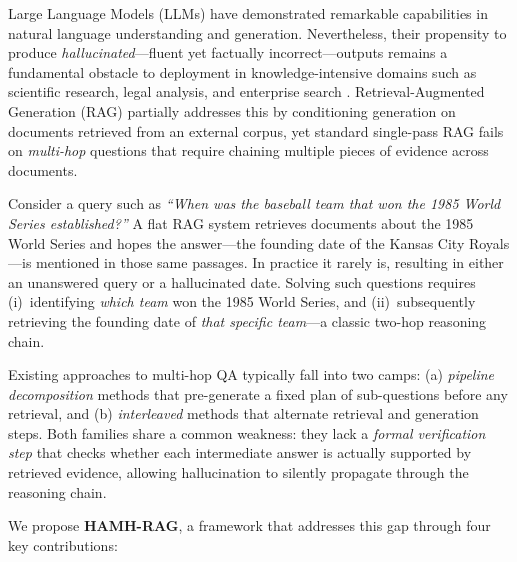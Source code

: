 \documentclass[conference]{IEEEtran}
\begin{document}
Large Language Models (LLMs) have demonstrated remarkable capabilities in
natural language understanding and generation.  Nevertheless, their
propensity to produce \emph{hallucinated}---fluent yet factually
incorrect---outputs remains a fundamental obstacle to deployment in
knowledge-intensive domains such as scientific research, legal analysis, and
enterprise search \cite{gao2023retrieval}.  Retrieval-Augmented Generation
(RAG) \cite{lewis2020retrieval} partially addresses this by conditioning
generation on documents retrieved from an external corpus, yet standard
single-pass RAG fails on \emph{multi-hop} questions that require chaining
multiple pieces of evidence across documents.

Consider a query such as \textit{``When was the baseball team that won the
1985 World Series established?''}  A flat RAG system retrieves documents
about the 1985 World Series and hopes the answer---the founding date of the
Kansas City Royals---is mentioned in those same passages.  In practice it
rarely is, resulting in either an unanswered query or a hallucinated date.
Solving such questions requires (i)~identifying \textit{which team} won the
1985 World Series, and (ii)~subsequently retrieving the founding date of
\textit{that specific team}---a classic two-hop reasoning chain.

Existing approaches to multi-hop QA typically fall into two camps: (a)
\emph{pipeline decomposition} methods \cite{min2019discrete,press2023measuring}
that pre-generate a fixed plan of sub-questions before any retrieval, and (b)
\emph{interleaved} methods \cite{trivedi2023interleaving,yao2023react} that
alternate retrieval and generation steps.  Both families share a common
weakness: they lack a \emph{formal verification step} that checks whether
each intermediate answer is actually supported by retrieved evidence, allowing
hallucination to silently propagate through the reasoning chain.

We propose \textbf{HAMH-RAG}, a framework that addresses this gap through four
key contributions:
\end{document}
